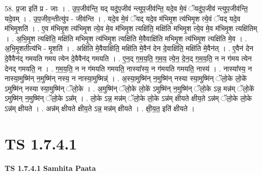 \documentclass[17pt]{extarticle}
\begin{document}
58. प्र॒जा इति॑ प्र - जाः । . उ॒प॒जीव॑न्ति॒ यद् यदु॑प॒जीव॑ न्त्युप॒जीव॑न्ति॒ यदे॒व मे॒वं ॅयदु॑प॒जीव॑ न्त्युप॒जीव॑न्ति॒ यदे॒वम् । . उ॒प॒जीव॒न्तीत्यु॑प - जीव॑न्ति । . यदे॒व मे॒वं ॅयद् यदे॒व म॑भिमृ॒श त्य॑भिमृ॒श त्ये॒वं ॅयद् यदे॒व म॑भिमृ॒शति॑ । . ए॒व म॑भिमृ॒श त्य॑भिमृ॒श त्ये॒व मे॒व म॑भिमृ॒श त्यक्षि॑ति॒ मक्षि॑ति मभिमृ॒श त्ये॒व मे॒व म॑भिमृ॒श त्यक्षि॑तिम् । . अ॒भि॒मृ॒श त्यक्षि॑ति॒ मक्षि॑ति मभिमृ॒श त्य॑भिमृ॒श त्यक्षि॑ति मे॒वैवाक्षि॑ति मभिमृ॒श त्य॑भिमृ॒श त्यक्षि॑ति मे॒व । . अ॒भि॒मृ॒शतीत्य॑भि - मृ॒शति॑ । . अक्षि॑ति मे॒वैवाक्षि॑ति॒ मक्षि॑ति मे॒वैन॑ देन दे॒वाक्षि॑ति॒ मक्षि॑ति मे॒वैन॑त् । . ए॒वैन॑ देन दे॒वैवैन॑द् गमयति गमय त्येन दे॒वैवैन॑द् गमयति । . ए॒न॒द् ग॒म॒य॒ति॒ ग॒म॒य॒ त्ये॒न॒ दे॒न॒द् ग॒म॒य॒ति॒ न न ग॑मय त्येन देनद् गमयति॒ न । . ग॒म॒य॒ति॒ न न ग॑मयति गमयति॒ नास्या᳚स्य॒ न ग॑मयति गमयति॒ नास्य॑ । . नास्या᳚स्य॒ न नास्या॒मुष्मि॑न् न॒मुष्मि॑न् नस्य॒ न नास्या॒मुष्मिन्न्॑ । . अ॒स्या॒मुष्मि॑न् न॒मुष्मि॑न् नस्या स्या॒मुष्मि॑न् ॅलो॒के लो॒के॑ ऽमुष्मि॑न् नस्या स्या॒मुष्मि॑न् ॅलो॒के । . अ॒मुष्मि॑न् ॅलो॒के लो॒के॑ ऽमुष्मि॑न् न॒मुष्मि॑न् ॅलो॒के ऽन्न॒ मन्न॑म् ॅलो॒के॑ ऽमुष्मि॑न् न॒मुष्मि॑न् ॅलो॒के ऽन्न᳚म् । . लो॒के ऽन्न॒ मन्न॑म् ॅलो॒के लो॒के ऽन्न॑म् क्षीयते क्षीय॒ते ऽन्न॑म् ॅलो॒के लो॒के ऽन्न॑म् क्षीयते । . अन्न॑म् क्षीयते क्षीय॒ते ऽन्न॒ मन्न॑म् क्षीयते । . क्षी॒य॒त॒ इति॑ क्षीयते । \newline
\pagebreak
{}
\section*{ TS 1.7.4.1 }

\textbf{TS 1.7.4.1 } \newline
\textbf{Samhita Paata} \newline
\end{document}
